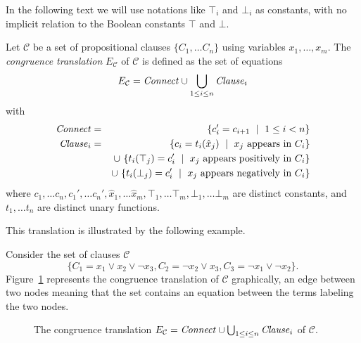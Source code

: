 \documentclass[smallextended]{svjour3}
\begin{document}
In the following text we will use notations like $\top_i$ and $\bot_i$ as constants, with
no implicit relation to the Boolean constants $\top$ and $\bot$.

\begin{definition}

Let $\mathcal{C}$ be a set of propositional clauses $\{C_1,\ldots C_n\}$ using variables $x_1,\ldots,x_m$.
The \emph{congruence translation} $E_{\mathcal{C}}$ of\/ $\mathcal{C}$ is defined as the set of equations
\begin{equation*}
E_{\mathcal{C}} = {\it Connect} \cup \bigcup_{1 \leq i \leq n}{\it Clause}_i 
\end{equation*}
with
\begin{eqnarray*}
	{\it Connect} &=& \{ c_{i}' = c_{i+1} \ \mid\ 1 \leq i < n\}\\
        {\it Clause}_i &=& \{ c_i = t_i(\hat{x}_j) \ \mid\ x_j \text{ appears in } C_i \}\\
           & & \cup\ \{ t_i(\top_j) = c_i' \ \mid\ x_j \text{ appears positively in } C_i \}\\
           & & \cup\ \{ t_i(\bot_j) = c_i' \ \mid\ x_j \text{ appears negatively in } C_i \}
\end{eqnarray*}
where $c_{1},\dots c_{n},c_{1}', \dots c_{n}',
\hat{x}_1, \dots \hat{x}_m, \top_1, \dots \top_m, \bot_1, \dots \bot_m$ are distinct constants, and $t_1, \dots t_n$ are
distinct unary functions.

\end{definition}

\noindent This translation is illustrated by the following example.

\begin{example}\label{ex:np1}
Consider the set of clauses $\mathcal{C}$
\begin{equation*}
\big\{C_1 = x_1 \vee x_2 \vee \neg x_3, C_2 = \neg x_2 \vee x_3, C_3 = \neg x_1 \vee \neg x_2\big\}.
\end{equation*}
Figure~\ref{fig:npexamplebig} represents the congruence translation of
$\mathcal{C}$ graphically, an edge between two nodes meaning that the set
contains an equation between the terms labeling the two nodes.

\begin{figure}[htb]

\caption{The congruence translation $E_{\mathcal{C}} = {\it Connect} \cup \bigcup_{1 \leq i \leq n}{\it Clause}_i$ of $\mathcal{C}$.}
\label{fig:npexamplebig}
\end{figure}

\end{example}
\end{document}
